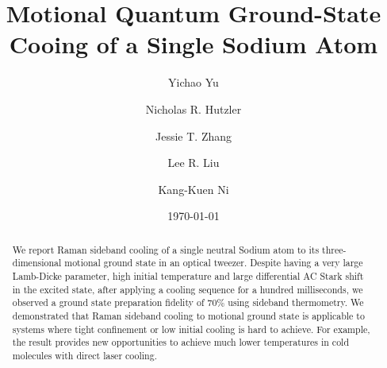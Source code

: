 \documentclass[aps,prl,twocolumn,groupedaddress]{revtex4-1}
\begin{document}
\title{Motional Quantum Ground-State Cooing of a Single Sodium Atom}
\author{Yichao Yu}
\author{Nicholas R. Hutzler}
\author{Jessie T. Zhang}
\author{Lee R. Liu}
\author{Kang-Kuen Ni}

\date{\today}

\begin{abstract}
  We report Raman sideband cooling of a single neutral Sodium atom to its three-dimensional
  motional ground state in an optical tweezer.
  Despite having a very large Lamb-Dicke parameter, high initial temperature and
  large differential AC Stark shift in the excited state,
  after applying a cooling sequence for a hundred milliseconds,
  we observed a ground state preparation fidelity of $70\%$ using sideband thermometry.
  We demonstrated that Raman sideband cooling to motional ground state is applicable to
  systems where tight confinement or low initial cooling is hard to achieve.
  For example, the result provides new opportunities to achieve much lower temperatures
  in cold molecules with direct laser cooling.
\end{abstract}

\maketitle
\end{document}
